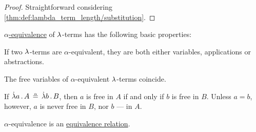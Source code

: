 \begin{proof}
   Straightforward considering \cref{thm:def:lambda_term_length/substitution}.
\end{proof}

\begin{proposition}\label{thm:def:lambda_term_alpha_equivalence}
  \hyperref[def:lambda_term_alpha_equivalence]{\( \alpha \)-equivalence} of \( {\mathrm \lambda} \)-terms has the following basic properties:
  \begin{thmenum}
     If two \( {\mathrm \lambda} \)-terms are \( \alpha \)-equivalent, they are both either variables, applications or abstractions.

     The free variables of \( \alpha \)-equivalent \( {\mathrm \lambda} \)-terms coincide.

     If \( \qabs a A \aequiv \qabs b B \), then \( a \) is free in \( A \) if and only if \( b \) is free in \( B \). Unless \( a = b \), however, \( a \) is never free in \( B \), nor \( b \) --- in \( A \).

     \( \alpha \)-equivalence is an \hyperref[def:equivalence_relation]{equivalence relation}.
  \end{thmenum}
\end{proposition}
